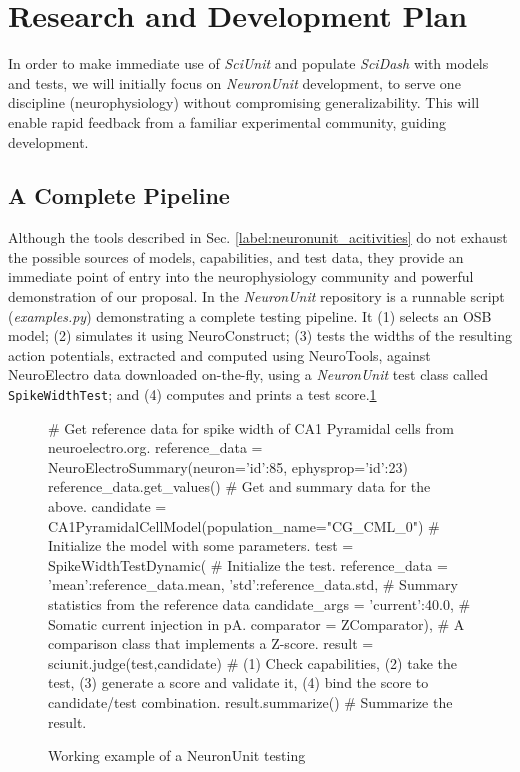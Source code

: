 \documentclass[11pt,letterpaper]{article}
\let\verbx\lstinline
\begin{document}

\section{Research and Development Plan}
In order to make immediate use of \textit{SciUnit} and populate \textit{SciDash} with models and tests, we will initially focus on \textit{NeuronUnit} development, to serve one discipline (neurophysiology) without compromising generalizability. This will enable rapid feedback from a familiar experimental community, guiding development.  

\subsection{A Complete Pipeline}
Although the tools described in Sec. \ref{label:neuronunit_acitivities} do not exhaust the possible sources of models, capabilities, and test data, they provide an immediate point of entry into the neurophysiology community and powerful demonstration of our proposal.  In the \textit{NeuronUnit} repository\cite{neurounit_url} is a runnable script (\textit{examples.py}) demonstrating a complete testing pipeline.  It (1) selects an OSB model; (2) simulates it using NeuroConstruct; (3) tests the widths of the resulting action potentials, extracted and computed using NeuroTools, against NeuroElectro data downloaded on-the-fly, using a \textit{NeuronUnit} test class called \verbx{SpikeWidthTest}; and (4) computes and prints a test score.\ref{fig:neuronunit_example}

\begin{figure}
\begin{python}
# Get reference data for spike width of CA1 Pyramidal cells from neuroelectro.org. 
reference_data = NeuroElectroSummary(neuron={'id':85}, ephysprop={'id':23})
reference_data.get_values()  # Get and summary data for the above. 
candidate = CA1PyramidalCellModel(population_name="CG_CML_0") # Initialize the model with some parameters.
test = SpikeWidthTestDynamic( # Initialize the test.    
	reference_data = {'mean':reference_data.mean, 'std':reference_data.std}, # Summary statistics from the reference data
	candidate_args = {'current':40.0}, # Somatic current injection in pA.  
	comparator = ZComparator), # A comparison class that implements a Z-score.  
result = sciunit.judge(test,candidate) # (1) Check capabilities, (2) take the test, (3) generate a score and validate it, (4) bind the score to candidate/test combination. 
result.summarize() # Summarize the result.  
\end{python}
\caption{Working example of a NeuronUnit testing}
\label{fig:neuronunit_example}
\end{figure}
\end{document}
